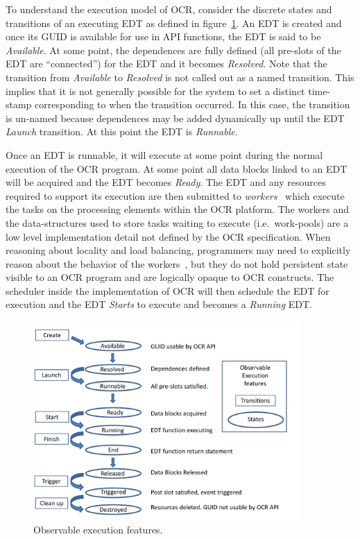To understand the execution model of OCR, consider the discrete states and
transitions of an executing EDT as defined in figure~\ref{fig:EDTexec}. An
EDT is created and once its GUID is available for use in API
functions, the EDT is said to be \emph{Available}. At some point, the dependences are fully defined (all
pre-slots of the EDT are ``connected'') for the EDT and it becomes
\emph{Resolved}.
Note that the transition from \emph{Available} to \emph{Resolved} is
not called out as a named transition. This implies that it is not
generally possible for the system to set a distinct time-stamp
corresponding to when the transition occurred. In this case, the transition is un-named
because dependences may be added dynamically up until the
EDT \emph{Launch} transition. At this point the
EDT is \emph{Runnable}.

Once an EDT is runnable, it will execute at some point during the normal execution
of the OCR program. At some point all data blocks linked to an EDT
will be acquired and the EDT becomes \emph{Ready}. The
EDT and any resources required to support its execution are then submitted to
\emph{workers}~\cite{GBRS09} which execute the tasks on
the processing elements within the OCR platform. The workers and the
data-structures used to store tasks waiting to execute
(i.e.\ work-pools) are a low level implementation detail not defined by
the OCR specification. When reasoning about locality and load
balancing, programmers may need to explicitly reason about the
behavior of the workers~\cite{Chatterjee13}, but they do not hold
persistent state visible to an OCR program and are logically opaque to
OCR constructs. The scheduler inside the implementation of OCR
will then schedule the EDT for execution and the EDT
\emph{Starts} to execute and
becomes a \emph{Running} EDT.
\begin{figure}
\centering
 \includegraphics[width=0.9\textwidth]{EDT_exec}
\caption{Observable execution features.}
\label{fig:EDTexec}
\end{figure}

